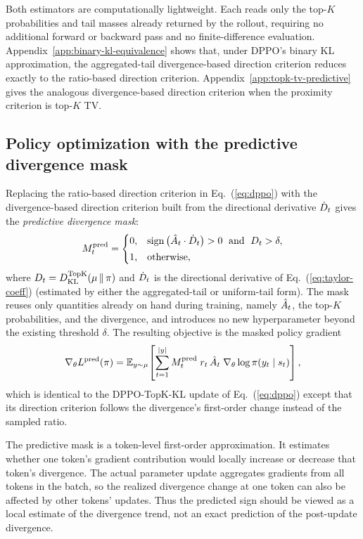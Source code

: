 Both estimators are computationally lightweight. Each reads only the top-$K$
probabilities and tail masses already returned by the rollout, requiring no
additional forward or backward pass and no finite-difference evaluation.
Appendix~\ref{app:binary-kl-equivalence} shows that, under DPPO's binary KL
approximation, the aggregated-tail divergence-based direction criterion reduces exactly to the
ratio-based direction criterion.
Appendix~\ref{app:topk-tv-predictive} gives the analogous divergence-based direction criterion
when the proximity criterion is top-$K$ TV.

\subsection{Policy optimization with the predictive divergence mask}
\label{sec:method-mask}

Replacing the ratio-based direction criterion in Eq.~(\ref{eq:dppo}) with the
divergence-based direction criterion built from the directional derivative $\dot{D}_t$ gives
the \emph{predictive divergence mask}:
\begin{equation}
\label{eq:predictive-mask}
M_t^{\mathrm{pred}} =
\begin{cases}
0, & \operatorname{sign}\big(\hat{A}_t\cdot\dot{D}_t\big)>0 \;\text{ and }\; D_t>\delta,\\[2pt]
1, & \text{otherwise,}
\end{cases}
\end{equation}
where $D_t=D_{\mathrm{KL}}^{\mathrm{TopK}}(\mu\,\|\,\pi)$ and $\dot{D}_t$ is the directional derivative of
Eq.~(\ref{eq:taylor-coeff}) (estimated by either the aggregated-tail or uniform-tail form). The mask reuses only
quantities already on hand during training, namely $\hat{A}_t$, the top-$K$ probabilities,
and the divergence, and introduces no new hyperparameter beyond the existing
threshold $\delta$. The resulting objective is the masked policy gradient
\begin{equation}
\label{eq:predictive-obj}
\nabla_\theta L^{\mathrm{pred}}(\pi)
= \mathbb{E}_{y\sim\mu}\!\left[\sum_{t=1}^{|y|}
M_t^{\mathrm{pred}}\; r_t\,\hat{A}_t\;\nabla_\theta\log\pi(y_t\mid s_t)\right],
\end{equation}
which is identical to the DPPO-TopK-KL update of Eq.~(\ref{eq:dppo}) except that its direction criterion follows the divergence's first-order change instead of the sampled ratio.

\begin{remark}
The predictive mask is a token-level first-order approximation.
It estimates whether one token's gradient contribution would locally increase or
decrease that token's divergence.
The actual parameter update aggregates gradients from all tokens in the batch, so
the realized divergence change at one token can also be affected by other tokens'
updates.
Thus the predicted sign should be viewed as a local estimate of the divergence
trend, not an exact prediction of the post-update divergence.
\end{remark}

